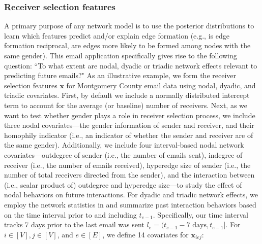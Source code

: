 \documentclass[ba]{imsart}
\numberwithin{equation}{section}
\theoremstyle{plain}
\begin{document}
	\subsubsection{Receiver selection features}
	A primary purpose of any network model is to use the posterior distributions to learn which features predict and/or explain edge formation (e.g., is edge formation reciprocal, are edges more likely to be formed among nodes with the same gender). This email application specifically gives rise to the following question: ``To what extent are nodal, dyadic or triadic network effects relevant to predicting future emails?" As an illustrative example, we form the receiver selection features $\boldsymbol{x}$ for Montgomery County email data using nodal, dyadic, and triadic covariates. First, by default we include a normally distributed intercept term to account for the average (or baseline) number of receivers. Next, as we want to test whether gender plays a role in receiver selection process, we include three nodal covariates---the gender information of sender and receiver, and their homophily indicator (i.e., an indicator of whether the sender and receiver are of the same gender). Additionally, we include four interval-based nodal network covariates---outdegree of sender (i.e., the number of emails sent), indegree of receiver (i.e., the number of emails received), hyperedge size of sender (i.e., the number of total receivers directed from the sender), and the interaction between (i.e., scalar product of) outdegree and hyperedge size---to study the effect of nodal behaviors on future interactions. For dyadic and triadic network effects, we employ the network statistics in \cite{PerryWolfe2012} and summarize past interaction behaviors based on the time interval prior to and including $t_{e-1}$. Specifically, our time interval tracks 7 days prior to the last email was sent $l_e= (t_{e-1}-7\mbox{ days}, t_{e-1}]$. For $i \in [V], j\in [V]$, and $e \in [E]$, we define 14 covariates for $\boldsymbol{x}_{iej}$:
\end{document}
